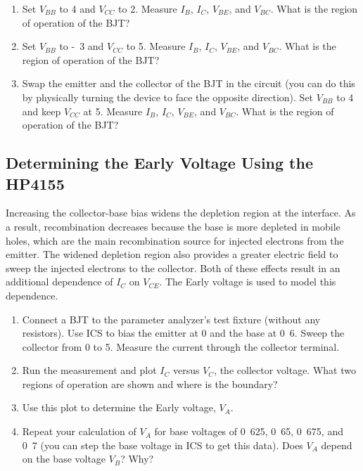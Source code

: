 \documentclass{article}
\begin{document}
\begin{enumerate}
\item Set $V_{BB}$ to \unit{4}{\volt} and $V_{CC}$ to \unit{2}{\volt}. Measure $I_B$, $I_C$, $V_{BE}$, and $V_{BC}$. What is the region of operation of the BJT?

\item Set $V_{BB}$ to \unit{-3}{\volt} and $V_{CC}$ to \unit{5}{\volt}. Measure $I_B$, $I_C$, $V_{BE}$, and $V_{BC}$. What is the region of operation of the BJT?

\item Swap the emitter and the collector of the BJT in the circuit (you can do this by physically turning the device to face the opposite direction). Set $V_{BB}$ to \unit{4}{\volt} and keep $V_{CC}$ at \unit{5}{\volt}. Measure $I_B$, $I_C$, $V_{BE}$, and $V_{BC}$. What is the region of operation of the BJT?

\end{enumerate}

\subsection{Determining the Early Voltage Using the HP4155}

Increasing the collector-base bias widens the depletion region at the interface. As a result, recombination decreases because the base is more depleted in mobile holes, which are the main recombination source for injected electrons from the emitter. The widened depletion region also provides a greater electric field to sweep the injected electrons to the collector. Both of these effects result in an additional dependence of $I_C$ on $V_{CE}$. The Early voltage is used to model this dependence.

\begin{enumerate}
\item Connect a BJT to the parameter analyzer's test fixture (without any resistors). Use ICS to bias the emitter at \unit{0}{\volt} and the base at \unit{0.6}{\volt}. Sweep the collector from \unit{0}{\volt} to \unit{5}{\volt}. Measure the current through the collector terminal.

\item Run the measurement and plot $I_C$ versus $V_{C}$, the collector voltage. What two regions of operation are shown and where is the boundary?

\item Use this plot to determine the Early voltage, $V_A$. 

\item Repeat your calculation of $V_A$ for base voltages of \unit{0.625}{\volt}, \unit{0.65}{\volt}, \unit{0.675}{\volt}, and \unit{0.7}{\volt} (you can step the base voltage in ICS to get this data). Does $V_A$ depend on the base voltage $V_B$? Why?

\end{enumerate}
\end{document}
